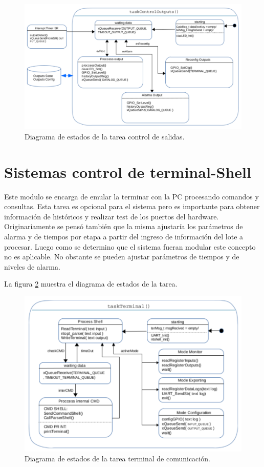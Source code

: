 \begin{figure}[h!]
	\hspace{-0.5cm}
	\includegraphics[width=1.0\textwidth]{Figures/Cap_3/diagrama_tarea_output}
	\caption{ Diagrama de estados de la tarea control de salidas. }
	\label{fig:diag_TareasOut}
\end{figure}

\section{ Sistemas control de terminal-Shell }
Este modulo se encarga de emular la terminar con la PC procesando comandos y consultas. Esta tarea es opcional para el sistema pero es importante para obtener información de históricos y realizar test de los puertos del hardware. 
Originariamente se pensó también que la misma ajustaría los parámetros de alarma y de tiempos por etapa a partir del ingreso de información del lote a procesar. Luego como se determino que el sistema fueran modular este concepto no es aplicable. No obstante se pueden ajustar parámetros de tiempos y de niveles de alarma.

La figura \ref{fig:diag_TareasShell} muestra el diagrama de estados de la tarea.
\begin{figure}[h!]
	\hspace{-0.1cm}
	\includegraphics[width=1.0\textwidth]{Figures/Cap_3/diagrama_tarea_terminal}
	\caption{ Diagrama de estados de la tarea terminal de comunicación. }
	\label{fig:diag_TareasShell}
\end{figure}


